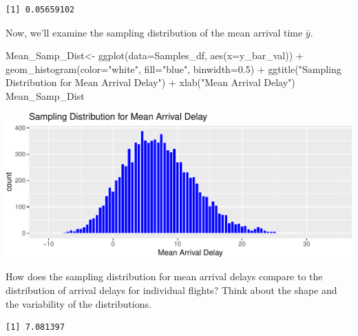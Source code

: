 \documentclass[
  letterpaper,
  DIV=11,
  numbers=noendperiod]{scrreprt}
\newenvironment{Shaded}{\begin{snugshade}}{\end{snugshade}}
\newcommand{\AttributeTok}[1]{\textcolor[rgb]{0.40,0.45,0.13}{#1}}
\newcommand{\FloatTok}[1]{\textcolor[rgb]{0.68,0.00,0.00}{#1}}
\newcommand{\FunctionTok}[1]{\textcolor[rgb]{0.28,0.35,0.67}{#1}}
\newcommand{\NormalTok}[1]{\textcolor[rgb]{0.00,0.23,0.31}{#1}}
\newcommand{\OtherTok}[1]{\textcolor[rgb]{0.00,0.23,0.31}{#1}}
\newcommand{\SpecialCharTok}[1]{\textcolor[rgb]{0.37,0.37,0.37}{#1}}
\newcommand{\StringTok}[1]{\textcolor[rgb]{0.13,0.47,0.30}{#1}}
\begin{document}
\begin{verbatim}
[1] 0.05659102
\end{verbatim}

Now, we'll examine the sampling distribution of the mean arrival time
\(\bar{y}\).

\begin{Shaded}
\begin{Highlighting}[]
\NormalTok{Mean\_Samp\_Dist}\OtherTok{\textless{}{-}} \FunctionTok{ggplot}\NormalTok{(}\AttributeTok{data=}\NormalTok{Samples\_df, }\FunctionTok{aes}\NormalTok{(}\AttributeTok{x=}\NormalTok{y\_bar\_val)) }\SpecialCharTok{+}
  \FunctionTok{geom\_histogram}\NormalTok{(}\AttributeTok{color=}\StringTok{"white"}\NormalTok{, }\AttributeTok{fill=}\StringTok{"blue"}\NormalTok{, }\AttributeTok{binwidth=}\FloatTok{0.5}\NormalTok{) }\SpecialCharTok{+} 
  \FunctionTok{ggtitle}\NormalTok{(}\StringTok{"Sampling Distribution for Mean Arrival Delay"}\NormalTok{) }\SpecialCharTok{+} 
  \FunctionTok{xlab}\NormalTok{(}\StringTok{"Mean Arrival Delay"}\NormalTok{)}
\NormalTok{Mean\_Samp\_Dist}
\end{Highlighting}
\end{Shaded}

\includegraphics{Ch3_files/figure-pdf/unnamed-chunk-22-1.pdf}

How does the sampling distribution for mean arrival delays compare to
the distribution of arrival delays for individual flights? Think about
the shape and the variability of the distributions.

\begin{Shaded}
\end{Shaded}

\begin{verbatim}
[1] 7.081397
\end{verbatim}
\end{document}
